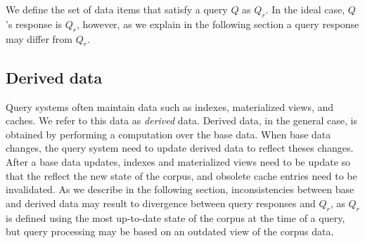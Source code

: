 


\noindent
We define the set of data items that satisfy a query $Q$ as $Q_r$.
In the ideal case, $Q$'s response is $Q_r$, however, as we explain in the following section a query response may
differ from $Q_r$.

\subsection{Derived data}
Query systems often maintain data such as indexes, materialized views, and caches.
We refer to this data as \textit{derived} data.
Derived data, in the general case, is obtained by performing a computation over the base data.
When base data changes, the query system need to update derived data to reflect theses changes.
After a base data updates, indexes and materialized views need to be update so that the reflect the new state of the corpus,
and obsolete cache entries need to be invalidated.
As we describe in the following section, inconsistencies between base and derived data may result to divergence between
query responses and $Q_r$, as $Q_r$ is defined using the most up-to-date state of the corpus at the time of a query, but
query processing may be based on an outdated view of the corpus data.

